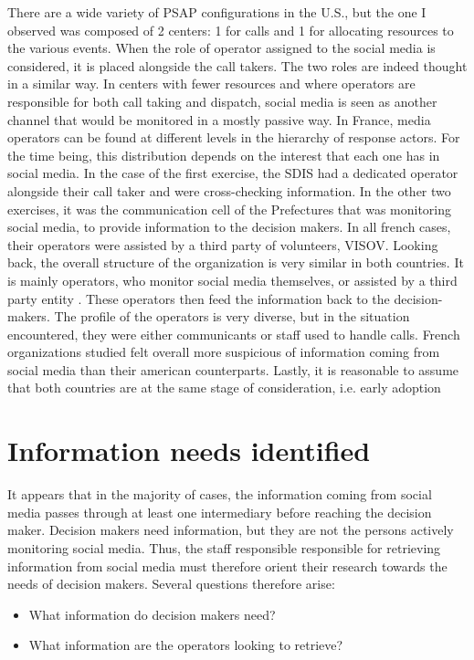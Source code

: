 There are a wide variety of PSAP configurations in the U.S., but the one I observed was composed of 2 centers:
1 for calls and 1 for allocating resources to the various events.
When the role of operator assigned to the social media is considered, it is placed alongside the call takers.
The two roles are indeed thought in a similar way.
In centers with fewer resources and where operators are responsible for both call taking and dispatch,
social media is seen as another channel that would be monitored in a mostly passive way.
In France, media operators can be found at different levels in the hierarchy of response actors.
For the time being, this distribution depends on the interest that each one has in social media.
In the case of the first exercise, the SDIS had a dedicated operator alongside their call taker
and were cross-checking information.
In the other two exercises, it was the communication cell of the Prefectures that was
monitoring social media, to provide information to the decision makers.
In all french cases, their operators were assisted by a third party of volunteers, VISOV.
Looking back, the overall structure of the organization is very similar in both countries.
It is mainly operators, who monitor social media themselves, or
assisted by a third party entity \parencite{batardIntegratingCitizenContributions2021}.
These operators then feed the information back to the decision-makers.
The profile of the operators is very diverse, but in the situation encountered, they
were either communicants or staff used to handle calls.
French organizations studied felt overall more suspicious of information coming from
social media \parencite{castagninoWhatCanWe2019} than their american counterparts.
Lastly, it is reasonable to assume that both countries are at the same stage of consideration, i.e. early adoption

\section{Information needs identified}
It appears that in the majority of cases, the information coming from social media passes through at least one intermediary before reaching the decision maker.
Decision makers need information, but they are not the persons actively monitoring social media.
Thus, the staff responsible responsible for retrieving information from social media must therefore orient their research towards the needs of decision makers.
Several questions therefore arise:

\begin{itemize}
    \item What information do decision makers need?
    \item What information are the operators looking to retrieve?
\end{itemize}

